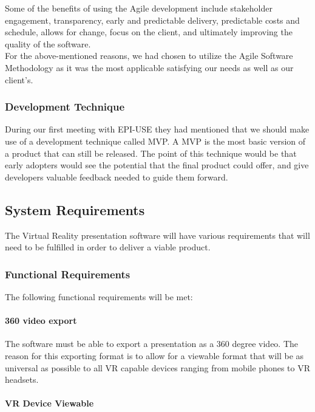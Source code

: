 \documentclass{article}
\begin{document}
Some of the benefits of using the Agile development include stakeholder engagement, transparency, early and predictable delivery, predictable costs and schedule, allows for change, focus on the client, and ultimately improving the quality of the software. \\

For the above-mentioned reasons, we had chosen to utilize the Agile Software Methodology as it was the most applicable satisfying our needs as well as our client's.

	\subsubsection{Development Technique}
	During our first meeting with EPI-USE they had mentioned that we should make use of a development technique called MVP. A MVP is the most basic version of a product that can still be released. The point of this technique would be that early adopters would see the potential that the final product could offer, and give developers valuable feedback needed to guide them forward.
	
\newpage

\subsection{System Requirements}

The Virtual Reality presentation software will have various requirements that will need to be fulfilled in order to deliver a viable product.

	\subsubsection{Functional Requirements}

	The following functional requirements will be met:

		\paragraph{360 video export}

		The software must be able to export a presentation as a 360 degree video.
		The reason for this exporting format is to allow for a viewable format that will be as universal as possible to all VR capable devices ranging from mobile phones to VR headsets.

		\paragraph{VR Device Viewable}
\end{document}
